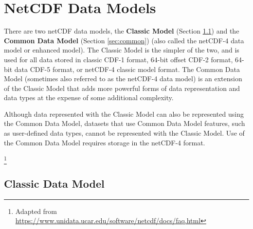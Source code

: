 \section{NetCDF Data Models}

{\itshape

There are two netCDF data models, the \textbf{Classic Model} (Section \ref{sec:classic}) and the \textbf{Common Data Model} (Section \ref{sec:common}) (also called the netCDF-4 data model or enhanced model). The Classic Model is the simpler of the two, and is used for all data stored in classic CDF-1 format, 64-bit offset CDF-2 format, 64-bit data CDF-5 format, or netCDF-4 classic model format. The Common Data Model (sometimes also referred to as the netCDF-4 data model) is an extension of the Classic Model that adds more powerful forms of data representation and data types at the expense of some additional complexity.

Although data represented with the Classic Model can also be represented using the Common Data Model, datasets that use Common Data Model features, such as user-defined data types, cannot be represented with the Classic Model. Use of the Common Data Model requires storage in the netCDF-4 format.
}\footnote{Adapted from \url{https://www.unidata.ucar.edu/software/netcdf/docs/faq.html}}

\subsection{Classic Data Model}
\label{sec:classic}

